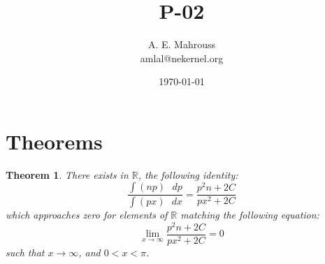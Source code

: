 \documentclass[10pt, twocolumn]{article}
\title{P-02}
\author{A. E. Mahrouss\\amlal@nekernel.org}
\date{\today}
\theoremstyle{plain}
\newtheorem{theorem}{Theorem}[section]
\theoremstyle{definition}
\theoremstyle{remark}
\begin{document}
\maketitle

\section{Theorems}
\begin{theorem}
    There exists in $\mathbb{R}$, the following identity:
    \begin{equation}
        \frac{\int (np) \text{ } dp}{\int (px) \text{ } dx} = \frac{p^2n+2C}{px^2+2C}
    \end{equation}
    which approaches zero for elements of $\mathbb{R}$ matching the following equation:
    \begin{equation}
        \lim_{x\to\infty} \frac{p^2n+2C}{px^2+2C} = 0
    \end{equation}
    such that $x \to \infty$, and $0 < x < \pi$.
\end{theorem}

\nocite{*}



\end{document}

